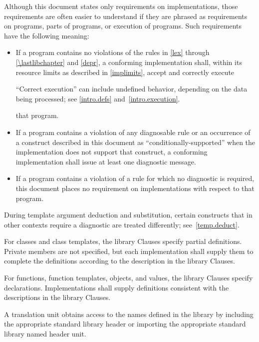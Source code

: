 \pnum
{}%
Although this document states only requirements on \Cpp{}
implementations, those requirements are often easier to understand if
they are phrased as requirements on programs, parts of programs, or
execution of programs. Such requirements have the following meaning:
\begin{itemize}
\item
If a program contains no violations of the rules in
\ref{lex} through \ref{\lastlibchapter} and \ref{depr},
a conforming implementation shall,
within its resource limits as described in \ref{implimits},
accept and correctly execute
\begin{footnote}
``Correct execution'' can include undefined behavior, depending on
the data being processed; see \ref{intro.defs} and~\ref{intro.execution}.
\end{footnote}
that program.
\item
{}%
If a program contains a violation of any diagnosable rule or an occurrence
of a construct described in this document as ``conditionally-supported'' when
the implementation does not support that construct, a conforming implementation
shall issue at least one diagnostic message.
\item
{}%
If a program contains a violation of a rule for which no diagnostic
is required, this document places no requirement on
implementations with respect to that program.
\end{itemize}
\begin{note}
During template argument deduction and substitution,
certain constructs that in other contexts require a diagnostic
are treated differently;
see~\ref{temp.deduct}.
\end{note}

\pnum
{}%
%
%
For classes and class templates, the library Clauses specify partial
definitions. Private members are not
specified, but each implementation shall supply them to complete the
definitions according to the description in the library Clauses.

\pnum
For functions, function templates, objects, and values, the library
Clauses specify declarations. Implementations shall supply definitions
consistent with the descriptions in the library Clauses.

\pnum
A \Cpp{}  translation unit
obtains access to the names defined in the library by
including the appropriate standard library header or importing
the appropriate standard library named header unit.

